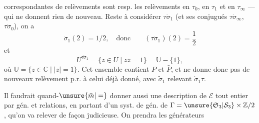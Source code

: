 correspondantes de relèvements  sont resp. les relèvements en $\tau_0$, en $\tau_1$ et en $\tau_\infty$ --- qui ne donnent rien de nouveau. Reste à considérer $\tau\dot\sigma_1$ (et ses conjugués  $\tau\dot\sigma_\infty$, $\tau\dot\sigma_0$), on a
\[
\dot\sigma_1(2)=1/2,\quad\text{donc}\qquad(\tau\dot\sigma_1)(2)=\frac12
\]
et
\[
U^{\tau\dot\sigma_1}=\{z\in U\mid z\bar z=1\}=\mathbb U-\{1\},
\]
où $\mathbb U=\{z\in\mathbb C\mid|z|=1\}$. Cet ensemble contient $P$ et $\bar P$, et ne donne donc pas de nouveaux relèvement p.r. à celui déjà donné, avec $\tilde\sigma_1$ relevant $\dot\sigma_1\tau$.

Il faudrait quand-$\unsure{\bar m|=}$ donner aussi une description de $\mathcal E$ tout entier par gén. et relations, en partant d'un syst. de gén. de $\Gamma=\unsure{\mathfrak S_3|\mathcal S_3}\times\mathbb Z/2$, qu'on va relever de façon judicieuse. On prendra les  générateurs
